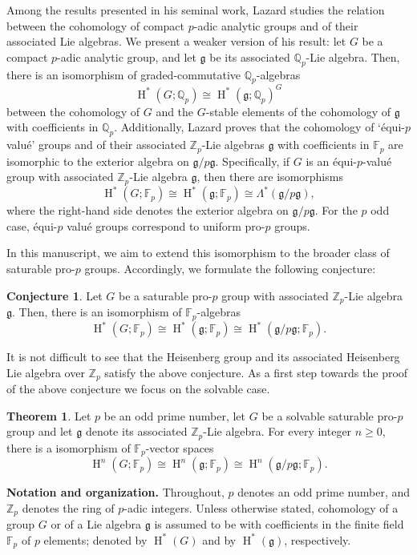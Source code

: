 \documentclass[11pt]{article}
\newcommand{\Z}{\mathbb{Z}}
\newcommand{\Q}{\mathbb{Q}}
\newcommand{\F}{\mathbb{F}}
\newcommand{\Fp}{\mathbb{F}_p}
\newcommand{\Zp}{\mathbb{Z}_p}
\newcommand{\g}{\mathfrak{g}}
\DeclareMathOperator{\HH}{H}
\newcommand{\isom}{\cong}
\theoremstyle{plain}
\theoremstyle{definition}
\newtheorem*{thm}{Theorem}
\newtheorem*{Conjecture}{Conjecture}
\begin{document}
Among the results presented in his seminal work, Lazard studies the relation between the cohomology of compact $p$-adic analytic groups and of their associated Lie algebras. We present a weaker version of his result: let $G$ be a compact $p$-adic analytic group,  and let $\g$ be its associated $\Q_p$-Lie algebra. Then, there is an isomorphism of graded-commutative $\Q_p$-algebras
\[
\HH^*(G;\Q_p)\cong \HH^*(\g;\Q_p)^G
\]
between the cohomology of $G$ and the $G$-stable elements of the cohomology of $\g$ with coefficients in $\Q_p$. Additionally, Lazard proves that the cohomology of `\'equi-$p$ valu\'e'  groups and of their associated $\Z_p$-Lie algebras $\g$ with coefficients in $\F_p$ are isomorphic to the exterior algebra on $\g/p\g$. Specifically, if $G$ is an \'equi-$p$-valu\'e group with associated $\Z_p$-Lie algebra $\g$, then there are isomorphisms
\[
\HH^*(G;\F_p)\cong \HH^*(\g;\F_p)\cong\Lambda^*(\g/p\g),
\]
where the right-hand side denotes the exterior algebra on $\g / p\g$. For the $p$ odd case, \'equi-$p$ valu\'e groups correspond to uniform pro-$p$ groups. 


In this manuscript, we aim to extend this isomorphism to the broader class of saturable pro-$p$ groups. Accordingly, we formulate the following conjecture:

\begin{Conjecture}
	Let $G$ be a saturable pro-$p$ group with associated $\Zp$-Lie algebra $\g$. Then, there is an isomorphism of $\Fp$-algebras 
	\begin{displaymath}
		\HH^{*}(G;\Fp)\isom \HH^{*}(\g;\Fp)\cong \HH^*(\g/p\g;\F_p).
	\end{displaymath}
\end{Conjecture}

It is not difficult to see that the Heisenberg group and its associated Heisenberg Lie algebra over $\Z_p$ satisfy the above conjecture. As a first step towards the proof of the above conjecture we focus on the solvable case.


 
\begin{thm}\label{thm: main}
Let $p$ be an odd prime number, let $G$ be a solvable saturable pro-$p$ group and let $\g$ denote its associated $\Z_p$-Lie algebra. For every integer $n\geq 0$, there is a isomorphism of $\F_p$-vector spaces
\[
\HH^n(G;\F_p)\cong \HH^n(\g;\F_p)\cong \HH^n(\g/p\g;\F_p).
\]
\end{thm}


\bigskip

\noindent
{\bf Notation and organization.} Throughout, $p$ denotes an odd prime number, and $\Z_p$ denotes the ring of $p$-adic integers. Unless otherwise stated, cohomology of a group $G$ or of a Lie algebra $\g$ is assumed to be with coefficients in the finite field $\F_p$ of $p$ elements; denoted by $\HH^*(G)$ and by $\HH^*(\g)$, respectively. 
\end{document}
